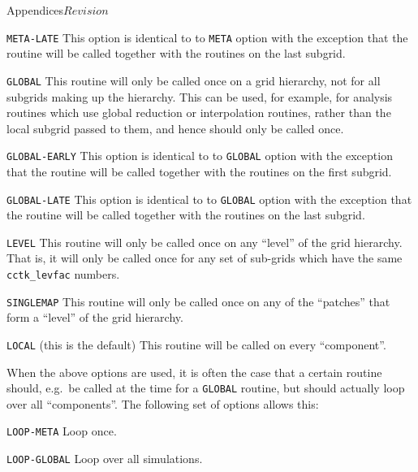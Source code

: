 \begin{cactuspart}{Appendices}{}{$Revision$}
\begin{Lentry}
\item[{\tt META-LATE}] This option is identical to to {\tt META}
  option with the exception that the routine will be called together
  with the routines on the last subgrid.
  
\item[{\tt GLOBAL}] This routine will only be called once on a grid
  hierarchy, not for all subgrids making up the hierarchy.  This can
  be used, for example, for analysis routines which use global
  reduction or interpolation routines, rather than the local subgrid
  passed to them, and hence should only be called once.
  
\item[{\tt GLOBAL-EARLY}] This option is identical to to {\tt GLOBAL}
  option with the exception that the routine will be called together
  with the routines on the first subgrid.
  
\item[{\tt GLOBAL-LATE}] This option is identical to to {\tt GLOBAL}
  option with the exception that the routine will be called together
  with the routines on the last subgrid.
  
\item[{\tt LEVEL}] This routine will only be called once on any
  ``level'' of the grid hierarchy.  That is, it will only be called
  once for any set of sub-grids which have the same
  \texttt{cctk\_levfac} numbers.
  
\item[{\tt SINGLEMAP}] This routine will only be called once on any of
  the ``patches'' that form a ``level'' of the grid hierarchy.
  
\item[{\tt LOCAL} (this is the default)] This routine will be called
  on every ``component''.

\end{Lentry}

When the above options are used, it is often the case that a certain
routine should, e.g.\ be called at the time for a \texttt{GLOBAL}
routine, but should actually loop over all ``components''.  The
following set of options allows this:

\begin{Lentry}
  
\item[{\tt LOOP-META}] Loop once.
  
\item[{\tt LOOP-GLOBAL}] Loop over all simulations.
  

\end{Lentry}
\end{cactuspart}
